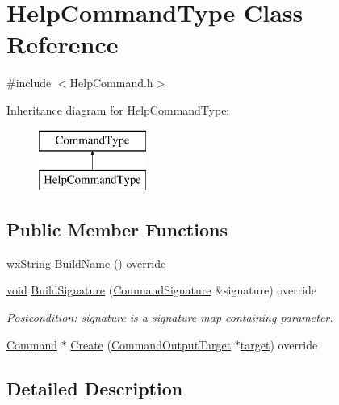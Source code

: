 \hypertarget{class_help_command_type}{}\section{Help\+Command\+Type Class Reference}
\label{class_help_command_type}


{\ttfamily \#include $<$Help\+Command.\+h$>$}

Inheritance diagram for Help\+Command\+Type\+:\begin{figure}[H]
\begin{center}
\leavevmode
\includegraphics[height=2.000000cm]{class_help_command_type}
\end{center}
\end{figure}
\subsection*{Public Member Functions}
\begin{DoxyCompactItemize}
\item 
wx\+String \hyperlink{class_help_command_type_ac911fe7aadab3f91f6184315934fc621}{Build\+Name} () override
\item 
\hyperlink{sound_8c_ae35f5844602719cf66324f4de2a658b3}{void} \hyperlink{class_help_command_type_af703b11a51b3a2d9fea220657c04e09e}{Build\+Signature} (\hyperlink{class_command_signature}{Command\+Signature} \&signature) override
\begin{DoxyCompactList}\small\item\em Postcondition\+: signature is a \textquotesingle{}signature\textquotesingle{} map containing parameter. \end{DoxyCompactList}\item 
\hyperlink{class_command}{Command} $\ast$ \hyperlink{class_help_command_type_a25dbc309a4afc8b836f53c0ce9f7ed36}{Create} (\hyperlink{class_command_output_target}{Command\+Output\+Target} $\ast$\hyperlink{lib_2expat_8h_a15a257516a87decb971420e718853137}{target}) override
\end{DoxyCompactItemize}


\subsection{Detailed Description}


